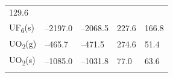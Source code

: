 \documentclass[
  9pt,
]{extbook}
\theoremstyle{definition}
\theoremstyle{definition}
\theoremstyle{definition}
\theoremstyle{remark}
\begin{document}
\begin{longtable}[]{@{}lllll@{}}
\begin{minipage}[t]{0.18\columnwidth}
129.6\strut
\end{minipage}\tabularnewline
\begin{minipage}[t]{0.10\columnwidth}\raggedright
UF\textsubscript{6}(s)\strut
\end{minipage} & \begin{minipage}[t]{0.19\columnwidth}\raggedright
--2197.0\strut
\end{minipage} & \begin{minipage}[t]{0.20\columnwidth}\raggedright
--2068.5\strut
\end{minipage} & \begin{minipage}[t]{0.18\columnwidth}\raggedright
227.6\strut
\end{minipage} & \begin{minipage}[t]{0.18\columnwidth}\raggedright
166.8\strut
\end{minipage}\tabularnewline
\begin{minipage}[t]{0.10\columnwidth}\raggedright
UO\textsubscript{2}(g)\strut
\end{minipage} & \begin{minipage}[t]{0.19\columnwidth}\raggedright
--465.7\strut
\end{minipage} & \begin{minipage}[t]{0.20\columnwidth}\raggedright
--471.5\strut
\end{minipage} & \begin{minipage}[t]{0.18\columnwidth}\raggedright
274.6\strut
\end{minipage} & \begin{minipage}[t]{0.18\columnwidth}\raggedright
51.4\strut
\end{minipage}\tabularnewline
\begin{minipage}[t]{0.10\columnwidth}\raggedright
UO\textsubscript{2}(s)\strut
\end{minipage} & \begin{minipage}[t]{0.19\columnwidth}\raggedright
--1085.0\strut
\end{minipage} & \begin{minipage}[t]{0.20\columnwidth}\raggedright
--1031.8\strut
\end{minipage} & \begin{minipage}[t]{0.18\columnwidth}\raggedright
77.0\strut
\end{minipage} & \begin{minipage}[t]{0.18\columnwidth}\raggedright
63.6\strut
\end{minipage}\tabularnewline
\begin{minipage}[t]{0.10\columnwidth}\raggedright

\end{minipage}
\end{longtable}
\end{document}
